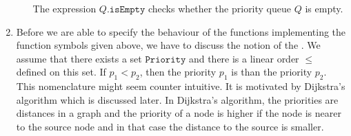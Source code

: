 \begin{Definition}
\begin{enumerate}
\begin{enumerate}
              The expression $Q.\texttt{isEmpty}$ checks whether the priority queue $Q$ is empty.
        \end{enumerate}
\item Before we are able to specify the behaviour of the functions implementing the function symbols
      given above, we have to discuss the notion of the .  We assume that there exists
      a set $\texttt{Priority}$ and there is a linear order $\leq$ defined on this set.
      If  $p_1 < p_2$, then the priority $p_1$ is  than the priority $p_2$.  This
      nomenclature might seem counter intuitive.  It is motivated by 
      Dijkstra's algorithm which is discussed later.  In Dijkstra's algorithm, the priorities are
      distances in a graph and the priority of a node is higher if the node is nearer to the source
      node and in that case the distance to the source is smaller.


\end{enumerate}
\end{Definition}

